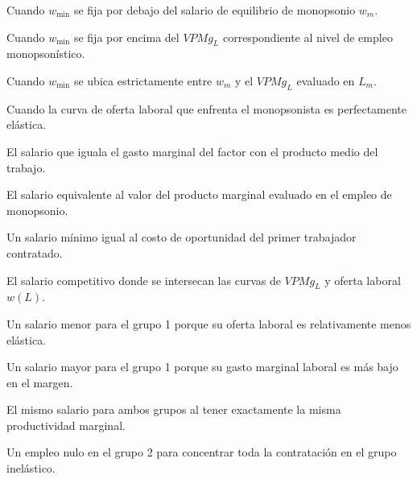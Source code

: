 \begin{opts}
    \item Cuando $w_{\min}$ se fija por debajo del salario de equilibrio de monopsonio $w_m$.
    \item Cuando $w_{\min}$ se fija por encima del $VPMg_L$ correspondiente al nivel de empleo monopsonístico.
    \item Cuando $w_{\min}$ se ubica estrictamente entre $w_m$ y el $VPMg_L$ evaluado en $L_m$.
    \item Cuando la curva de oferta laboral que enfrenta el monopsonista es perfectamente elástica.
\end{opts}

\begin{opts}
    \item El salario que iguala el gasto marginal del factor con el producto medio del trabajo.
    \item El salario equivalente al valor del producto marginal evaluado en el empleo de monopsonio.
    \item Un salario mínimo igual al costo de oportunidad del primer trabajador contratado.
    \item El salario competitivo donde se intersecan las curvas de $VPMg_L$ y oferta laboral $w(L)$.
\end{opts}

\begin{opts}
    \item Un salario menor para el grupo 1 porque su oferta laboral es relativamente menos elástica.
    \item Un salario mayor para el grupo 1 porque su gasto marginal laboral es más bajo en el margen.
    \item El mismo salario para ambos grupos al tener exactamente la misma productividad marginal.
    \item Un empleo nulo en el grupo 2 para concentrar toda la contratación en el grupo inelástico.
\end{opts}

